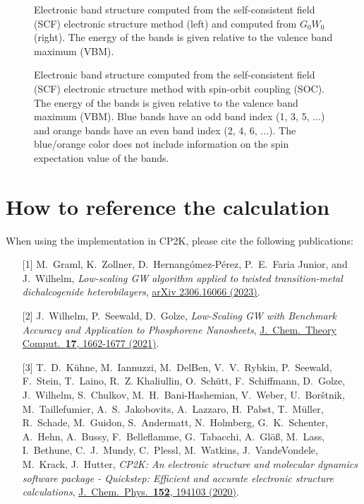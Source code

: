 \documentclass[11pt, a4paper]{scrartcl}
\newlength\figureheight
\newlength\figurewidth
\begin{document}
\begin{figure}[h!]
\centering
\setlength\figureheight{11cm} 
\setlength{}

\hspace{-2.5em}
\setlength{}

\caption{Electronic band structure computed from the self-consistent field (SCF) electronic structure method (left) and computed from $G_0W_0$ (right). The energy of the bands is given relative to the valence band maximum (VBM).}
\end{figure}

\begin{figure}[h!]
\centering
\setlength\figureheight{11cm} 
\setlength{}

\hfill

\caption{Electronic band structure computed from the self-consistent field (SCF) electronic structure method with spin-orbit coupling (SOC). The energy of the bands is given relative to the valence band maximum (VBM).
%
Blue bands have an odd band index (1, 3, 5, $\ldots$) and orange bands have an even band index (2, 4, 6, $\ldots$). 
%
The blue/orange color does not include information on the spin expectation value of the bands. 
}
    \label{f3}
\end{figure}




\section{How to reference the \GW calculation}
When using the \GW implementation in CP2K, please cite the following publications:
\begin{enumerate}[leftmargin=*]

\item[[1{]}] M.~Graml, K.~Zollner, D.~Hernangómez-Pérez, P.~E.~Faria Junior, and J.~Wilhelm, \textit{Low-scaling GW algorithm applied to twisted transition-metal dichalcogenide heterobilayers}, \href{
https://doi.org/10.48550/arXiv.2306.16066}{arXiv 2306.16066 (2023)}.

\item[[2{]}] J.~Wilhelm, P.~Seewald, D.~Golze, \textit{Low-Scaling GW with Benchmark Accuracy and Application to Phosphorene Nanosheets}, \href{https://doi.org/10.1021/acs.jctc.0c01282}{
J.~Chem.~Theory Comput.~\textbf{17}, 1662-1677 (2021)}.


\item[[3{]}] T.~D.~Kühne, M.~Iannuzzi, M.~Del\;Ben, V.~V.~Rybkin, P.~Seewald, F.~Stein, T.~Laino, R.~Z. Khaliullin, O.~Schütt, F.~Schiffmann, D.~Golze, J.~Wilhelm, S.~Chulkov, M.~H.~Bani-Hashe\-mian, V.~Weber,  U.~Bor\v{s}t\-nik, M.~Taillefumier, A.~S.~Jakobovits, A.~Lazzaro, H.~Pabst,  T.~Müller,  R.~Schade, M.~Guidon, S.~Ander\-matt, N.~Holmberg, G.~K.~Schenter, A.~Hehn, A.~Bussy,  F.~Belleflamme, G.~Tabacchi, A.~Glöß, M.~Lass, I.~Bethune, C.~J.~Mundy, C.~Plessl, M.~Watkins, J.~VandeVondele, M.~Krack, J.~Hutter, \textit{CP2K: An electronic structure and molecular dynamics software package - Quickstep: Efficient and accurate electronic structure calculations}, \href{https://doi.org/10.1063/5.0007045}{J.~Chem.~Phys.~\textbf{152}, 194103 (2020)}.


\end{enumerate}
\end{document}
